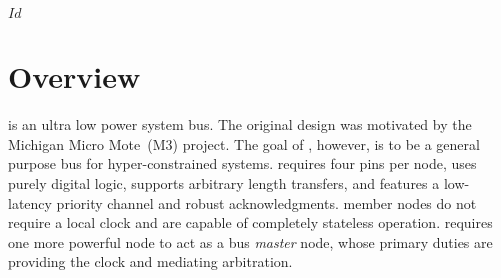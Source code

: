 \svnInfo $Id$

\section*{Overview}
\bus is an ultra low power system bus. The original design was motivated by
the Michigan Micro Mote~(M3) project. The goal of \bus, however, is to be a
general purpose bus for hyper-constrained systems. \bus requires four pins per
node, uses purely digital logic, supports arbitrary length transfers, and
features a low-latency priority channel and robust acknowledgments. \bus
member nodes do not require a local clock and are capable of completely
stateless operation. \bus requires one more powerful node to act as a bus {\em
master} node, whose primary duties are providing the \bus clock and mediating
arbitration.
